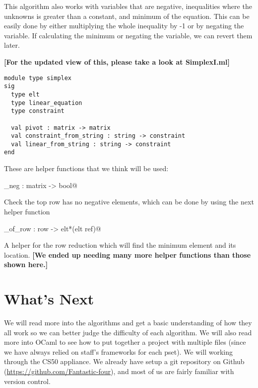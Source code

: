 \documentclass[letterpaper,11pt]{article}
\newcommand{\annot}[1]{\textbf{\color{BrickRed} [#1]}}
\begin{document}
This algorithm also works with variables that are negative, inequalities where
the unknowns is greater than a constant, and minimum of the equation. This can
be easily done by either multiplying the whole inequality by -1 or by negating
the variable. If calculating the minimum or negating the variable, we can revert
them later.  

{\annot{For the updated view of this, please take a look at SimplexI.ml}}
\begin{verbatim}
module type simplex
sig
  type elt
  type linear_equation
  type constraint

  val pivot : matrix -> matrix
  val constraint_from_string : string -> constraint
  val linear_from_string : string -> constraint
end
\end{verbatim}

These are helper functions that we think will be used:

\verb@no_neg : matrix -> bool@ 

Check the top row has no negative elements, which can be done by using the next
helper function

\verb@min_of_row : row -> elt*(elt ref)@

A helper for the row reduction which will find the minimum element and its
location.
{\annot{We ended up needing many more helper functions than those shown here.}}

\section{What's Next}

We will read more into the algorithms and get a basic understanding of how they
all work so we can better judge the difficulty of each algorithm. We will also
read more into OCaml to see how to put together a project with multiple files
(since we have always relied on staff’s frameworks for each pset). We will
working through the CS50 appliance. We already have setup a git repository on
Github (\url{https://github.com/Fantastic-four}), and most of us are fairly
familiar with version control. 
\end{document}

